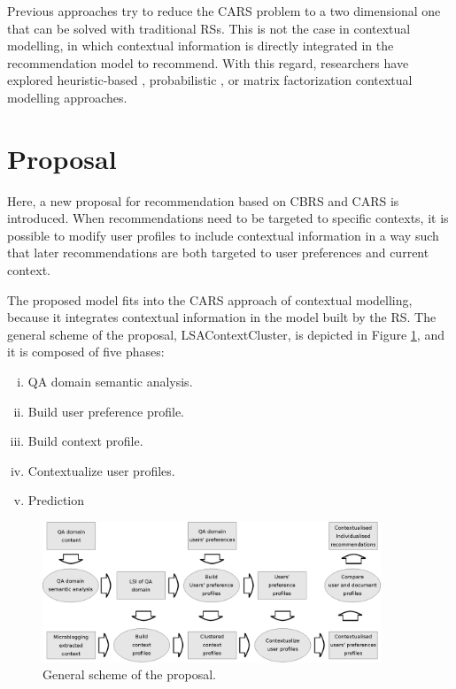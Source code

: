 \documentclass[preprint]{elsarticle}
\begin{document}
\begin{spacing}{1.5}
Previous approaches try to reduce the CARS problem to a two dimensional one that can be solved with traditional RSs. This is not the case in contextual modelling, in which contextual information is directly integrated in the recommendation model to recommend. With this regard, researchers have explored heuristic-based \cite{Panniello2014}, probabilistic \cite{Adomavicius2005b}, or matrix factorization \cite{Baltrunas2011c} contextual modelling approaches.

\section{Proposal}
\label{sec:proposal}

Here, a new proposal for recommendation based on CBRS and CARS is introduced. When recommendations need to be targeted to specific contexts, it is possible to modify user profiles to include contextual information in a way such that later recommendations are both targeted to user preferences and current context.

The proposed model fits into the CARS approach of contextual modelling, because it integrates contextual information in the model built by the RS. The general scheme of the proposal, LSAContextCluster, is depicted in Figure \ref{fig:proposal-scheme}, and it is composed of five phases:
\begin{enumerate}[(i)]
	\item QA domain semantic analysis.
	\item Build user preference profile.
	\item Build context profile.
	\item Contextualize user profiles.
	\item Prediction
\end{enumerate}

\begin{figure}[h]
	\centering
	\includegraphics[width=0.9\textwidth]{figures/proposal-scheme.eps}
	\caption{General scheme of the proposal.}
	\label{fig:proposal-scheme}
\end{figure}


\end{spacing}
\end{document}
